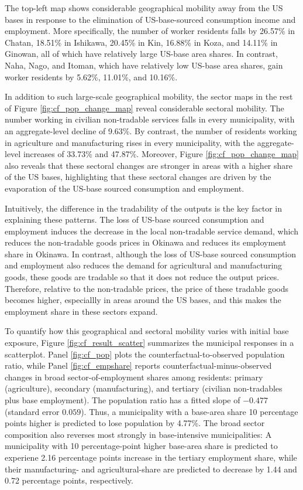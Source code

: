 \documentclass[12pt, unicode, a4paper]{article}
\newcommand{\1}{\mbox{1}\hspace{-0.25em}\mbox{l}} %
\begin{document}
The top-left map shows considerable geographical mobility away from the US bases in response to the elimination of US-base-sourced consumption income and employment. More specifically, the number of worker residents falls by 26.57\% in Chatan, 18.51\% in Ishikawa, 20.45\% in Kin, 16.88\% in Koza, and 14.11\% in Ginowan, all of which have relatively large US-base area shares. In contrast, Naha, Nago, and Itoman, which have relatively low US-base area shares, gain worker residents by 5.62\%, 11.01\%, and 10.16\%. 

In addition to such large-scale geographical mobility, the sector maps in the rest of Figure \ref{fig:cf_pop_change_map} reveal considerable sectoral mobility. The number working in civilian non-tradable services falls in every municipality, with an aggregate-level decline of 9.63\%.
By contrast, the number of residents working in agriculture and manufacturing rises in every municipality, with the aggregate-level increases of 33.73\% and 47.87\%. Moreover, Figure \ref{fig:cf_pop_change_map} also reveals that these sectoral changes are stronger in areas with a higher share of the US bases, highlighting that these sectoral changes are driven by the evaporation of the US-base sourced consumption and employment.

Intuitively, the difference in the tradability of the outputs is the key factor in explaining these patterns. The loss of US-base sourced consumption and employment induces the decrease in the local non-tradable service demand, which reduces the non-tradable goods prices in Okinawa and reduces its employment share in Okinawa.  
In contrast, although the loss of US-base sourced consumption and employment also reduces the demand for agricultural and manufacturing goods, these goods are tradable so that it does not reduce the output prices. Therefore, relative to the non-tradable prices, the price of these tradable goods becomes higher, especiallly in areas around the US bases, and this makes the employment share in these sectors expand. 

To quantify how this geographical and sectoral mobility varies with initial base exposure, Figure \ref{fig:cf_result_scatter} summarizes the municipal responses in a scatterplot. Panel \ref{fig:cf_pop} plots the counterfactual-to-observed population ratio, while Panel \ref{fig:cf_empshare} reports counterfactual-minus-observed changes in broad sector-of-employment shares among residents: primary (agriculture), secondary (manufacturing), and tertiary (civilian non-tradables plus base employment).
The population ratio has a fitted slope of $-0.477$ (standard error $0.059$). Thus, a municipality with a base-area share 10 percentage points higher is predicted to lose population by 4.77\%. The broad sector composition also reverses most strongly in base-intensive municipalities: A municipality with 10 percentage-point higher base-area share is predicted to experiene 2.16 percentage points increase in the tertiary employment share, while their manufacturing- and agricultural-share are predicted to decrease by 1.44 and 0.72 percentage points, respectively. 
\end{document}
